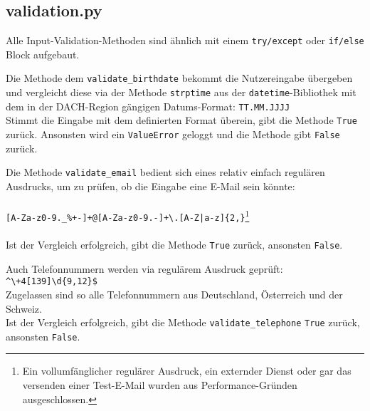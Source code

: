         \subsection{validation.py} \label{validation.py}
            Alle Input-Validation-Methoden sind ähnlich mit einem \verb|try/except| oder \verb|if/else| Block aufgebaut.

                Die Methode dem \verb|validate_birthdate| bekommt die Nutzereingabe übergeben und vergleicht diese via der Methode \verb|strptime| aus der \verb|datetime|-Bibliothek \cite{datetime} mit dem in der DACH-Region gängigen Datums-Format: \verb|TT.MM.JJJJ| \\
                Stimmt die Eingabe mit dem definierten Format überein, gibt die Methode \verb|True| zurück. Ansonsten wird ein \verb|ValueError| geloggt und die Methode gibt \verb|False| zurück.

                Die Methode \verb|validate_email| bedient sich eines relativ einfach regulären Ausdrucks, um zu prüfen, ob die Eingabe eine E-Mail sein könnte: \\
                \\
                \verb/[A-Za-z0-9._%+-]+@[A-Za-z0-9.-]+\.[A-Z|a-z]{2,}/\footnote{Ein vollumfänglicher regulärer Ausdruck, ein externder Dienst oder gar das versenden einer Test-E-Mail wurden aus Performance-Gründen ausgeschlossen.} \\ 
                \\
                Ist der Vergleich erfolgreich, gibt die Methode \verb|True| zurück, ansonsten \verb|False|.

                Auch Telefonnummern werden via regulärem Ausdruck geprüft: \\\verb/^\+4[139]\d{9,12}$/ \\
                Zugelassen sind so alle Telefonnummern aus Deutschland, Österreich und der Schweiz.\\
                Ist der Vergleich erfolgreich, gibt die Methode \verb|validate_telephone| \verb|True| zurück, ansonsten \verb|False|.

